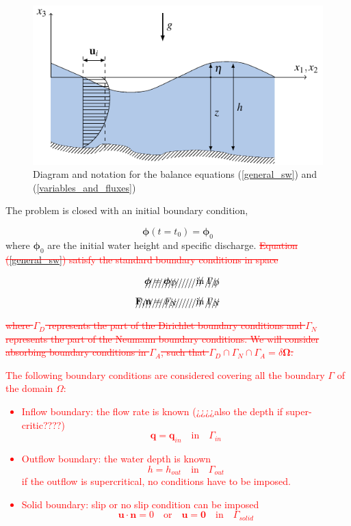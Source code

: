 \documentclass[a4paper,12pt]{elsarticle}
\newcommand{\Miguel}[1]{\textcolor{red}{#1}}
\begin{document}
\begin{figure}
    \centering
    \includegraphics[width=.8\textwidth]{img/fig/diagram.pdf}
    \caption{Diagram and notation for the balance equations (\ref{general_sw}) and (\ref{variables_and_fluxes})}
    \label{diagram}
\end{figure}

The problem is closed with an initial boundary condition,

\begin{equation}
\bm{\phi}(t=t_0) = \bm{\phi}_0
\end{equation}
where $\bm{\phi}_0$ are the initial water height and specific discharge.
\Miguel{\sout{
Equation (\ref{general_sw}) satisfy the standard boundary conditions in space
}}

\Miguel{
\begin{align*}
\xout{\bm{\phi} = \bm{\phi}_D \qquad }&\text{\xout{in}}\xout{ \ \Gamma_D} \\
\xout{\mathbf{F}_i\mathbf{n} = F_N \qquad }&\text{\xout{in}}\xout{ \ \Gamma_N}
\end{align*}
\sout{
where $\Gamma_D$ represents the part of the Dirichlet boundary conditions and $\Gamma_N$ represents the part of the Neumann boundary conditions. We will consider absorbing boundary conditions in $\Gamma_A$, such that $\Gamma_D \cap \Gamma_N \cap \Gamma_A = \delta\bm{\Omega}$.
}}

\Miguel{
The following boundary conditions are considered covering all the boundary $\Gamma$ of the domain $\Omega$:
\begin{itemize}
    \item Inflow boundary: the flow rate is known (¿¿¿¿also the depth if super-critic????)
    \begin{equation*}
        \mathbf{q} = \mathbf{q}_{in} \quad \text{in} \quad \Gamma_{in}
    \end{equation*}
    \item Outflow boundary: the water depth is known
    \begin{equation*}
        h = h_{out} \quad \text{in} \quad \Gamma_{out}
    \end{equation*}
    if the outflow is supercritical, no conditions have to be imposed.
    \item Solid boundary: slip or no slip condition can be imposed
    \begin{equation*}
        \mathbf{u} \cdot \mathbf{n} = 0 \quad \text{or} \quad \mathbf{u} = \mathbf{0} \quad \text{in} \quad \Gamma_{solid}
    \end{equation*}
\end{itemize}
}
\end{document}
